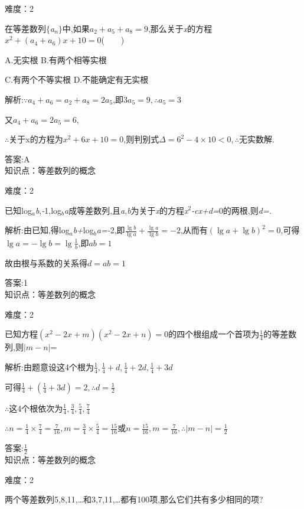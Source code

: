 \documentclass{article} %
\begin{document}
难度：2

 在等差数列$\mathrm{\{}$\textit{a${}_{n}$}$\mathrm{\}}$中,如果$a_2+a_5+a_8=9$,那么关于\textit{x}的方程$x^2+(a_4+a_6)x+10=0$(\textit{　　})

 A.无实根 B.有两个相等实根

 C.有两个不等实根 D.不能确定有无实根

 解析:$\because a_4+a_6=a_2+a_8=2a_5$,即$3a_5=9, \therefore a_5 = 3$

又$a_4+a_6 = 2a_5 = 6$,

$\therefore$关于x的方程为$x^2+6x+10=0$,则判别式$\Delta =6^2-4\times 10 < 0,\therefore$无实数解.

 答案:A \\

知识点：等差数列的概念

难度：2

 已知log\textit{${}_{a}$b},\textit{-}1,log\textit{${}_{b}$a}成等差数列,且\textit{a},\textit{b}为关于\textit{x}的方程\textit{x}${}^{2}$\textit{-cx+d=}0的两根,则\textit{d=\underbar{　　　　　}.~}

 解析:由已知,得log\textit{${}_{a}$b+}log\textit{${}_{b}$a=-}2,即$\frac{\lg b }{\lg a}+\frac{\lg a}{\lg b} = -2$,从而有$(\lg a+\lg b)^2 = 0$,可得$\lg a = -\lg b = \lg \frac{1}{b}$,即$ab = 1$

故由根与系数的关系得$d = ab = 1$

 答案:1 \\

知识点：等差数列的概念

难度：2

 已知方程$(x^2-2x+m)(x^2-2x+n)=0$的四个根组成一个首项为$\frac{1}{4}$的等差数列,则$|m-n|$=\underbar{　　　　　}

 解析:由题意设这4个根为$\frac{1}{4},\frac{1}{4}+d, \frac{1}{4}+2d, \frac{1}{4}+3d$

可得$\frac{1}{4}+(\frac{1}{4}+3d) = 2, \therefore d = \frac{1}{2}$

\textit{$\therefore$}这4个根依次为$\frac{1}{4},\frac{3}{4},\frac{5}{4},\frac{7}{4}$

$\therefore n = \frac{1}{4} \times \frac{7}{4}=\frac{7}{16}, m = \frac{3}{4}\times \frac{5}{4}=\frac{15}{16}$或$n = \frac{15}{16}, m= \frac{7}{16}, \therefore |m-n| = \frac{1}{2}$

 答案:$\frac{1}{2}$ \\

知识点：等差数列的概念

难度：2

 两个等差数列5,8,11,{\dots}和3,7,11,{\dots}都有100项,那么它们共有多少相同的项?
\end{document}
